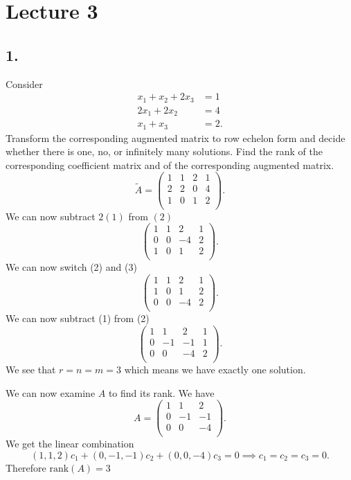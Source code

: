 \section*{Lecture 3}

\subsection*{1.}
Consider
\begin{align*}
  x_1 + x_2 + 2x_3 &= 1 \\
  2x_1 + 2x_2 &= 4 \\
  x_1 + x_3 &= 2
.\end{align*}
Transform the corresponding augmented matrix to row echelon form and decide whether there is one, no, or infinitely many solutions. Find the rank of the corresponding coefficient matrix and of the corresponding augmented matrix.
\[ 
\tilde{A} = \left( \begin{array}{ccc|c}
1 & 1 & 2 & 1\\
2 & 2 & 0 & 4\\
1 & 0 & 1 & 2\\
\end{array} \right)
.\]
We can now subtract $2(1)$ from $(2)$
\[ 
\left( \begin{array}{ccc|c}
1 & 1 & 2 & 1\\
0 & 0 & -4 & 2\\
1 & 0 & 1 & 2\\
\end{array} \right)
.\]
We can now switch (2) and (3)
\[ 
\left( \begin{array}{ccc|c}
1 & 1 & 2 & 1\\
1 & 0 & 1 & 2\\
0 & 0 & -4 & 2\\
\end{array} \right)
.\]
We can now subtract (1) from (2)
\[ 
\left( \begin{array}{ccc|c}
1 & 1 & 2 & 1\\
0 & -1 & -1 & 1\\
0 & 0 & -4 & 2\\
\end{array} \right)
.\]
We see that $r = n = m = 3$ which means we have exactly one solution.

We can now examine $A$ to find its rank. We have
\[ 
A = \begin{pmatrix}
1 & 1 & 2\\
0 & -1 & -1\\
0 & 0 & -4\\
\end{pmatrix}
.\]
We get the linear combination
\[ 
  (1,1,2)c_1 + (0,-1,-1)c_2 + (0,0,-4)c_3 = 0 \implies c_1 = c_2 = c_3 = 0
.\]
Therefore $\mathrm{rank}(A) = 3$

